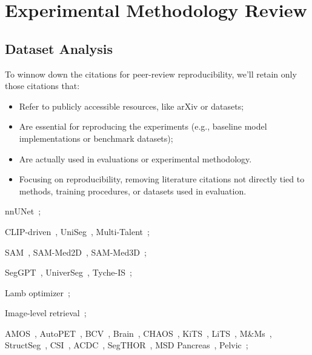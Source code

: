 \section*{Experimental Methodology Review}
\label{sec:experimental_methodology}

\subsection{Dataset Analysis}
To winnow down the citations for peer-review reproducibility, we'll retain only those citations that:
\begin{itemize}
\item    Refer to publicly accessible resources, like arXiv or datasets;

  \item  Are essential for reproducing the experiments (e.g., baseline model implementations or benchmark datasets);

\item    Are actually used in evaluations or experimental methodology.

\item Focusing on reproducibility, removing literature citations not directly tied to methods, training procedures, or datasets used in evaluation.

\end{itemize}
nnUNet~\cite{isensee2021nnu};

CLIP-driven~\cite{liu2023clipdriven},
UniSeg~\cite{ye2023uniseg},
Multi-Talent~\cite{ulrich2023multitalent};

SAM~\cite{kirillov2023segmentanything},
SAM-Med2D~\cite{cheng2023sammed2d},
SAM-Med3D~\cite{wang2024sammed3d};

SegGPT~\cite{wang2023seggpt},
UniverSeg~\cite{butoi2023universeg},
Tyche-IS~\cite{rakic2024tyche};

Lamb optimizer~\cite{you2019large};

Image-level retrieval~\cite{zhang2023makes};

AMOS~\cite{ji2022amos},
AutoPET~\cite{gatidis2022autopet},
BCV~\cite{bcv},
Brain~\cite{rodrigue2022brain},
CHAOS~\cite{CHAOS2021},
KiTS~\cite{heller2019kits19},
LiTS~\cite{bilic2019liver},
M\&Ms~\cite{campello2021mnm},
StructSeg~\cite{structseg},
CSI~\cite{guoyan2018csi},
ACDC~\cite{bernard2018acdc},
SegTHOR~\cite{lambert2020segthor},
MSD Pancreas~\cite{antonelli2022msd},
Pelvic~\cite{liu2021pelvic};

